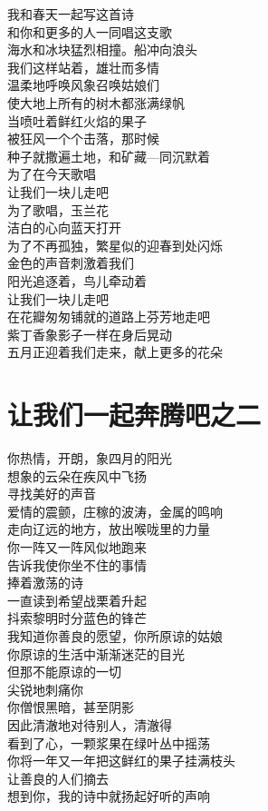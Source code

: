 \documentclass[]{book}
\renewenvironment{quote}{\begin{VF}}{\end{VF}}
\begin{document}
\begin{quote}
我和春天一起写这首诗\\
和你和更多的人一同唱这支歌\\
海水和冰块猛烈相撞。船冲向浪头\\
我们这样站着，雄壮而多情\\
温柔地呼唤风象召唤姑娘们\\
使大地上所有的树木都涨满绿帆\\
当喷吐着鲜红火焰的果子\\
被狂风一个个击落，那时候\\
种子就撒遍土地，和矿藏---同沉默着\\
为了在今天歌唱\\
让我们一块儿走吧\\
为了歌唱，玉兰花\\
洁白的心向蓝天打开\\
为了不再孤独，繁星似的迎春到处闪烁\\
金色的声音刺激着我们\\
阳光追逐着，鸟儿牵动着\\
让我们一块儿走吧\\
在花瓣匆匆铺就的道路上芬芳地走吧\\
紫丁香象影子一样在身后晃动\\
五月正迎着我们走来，献上更多的花朵
\end{quote}

\section{让我们一起奔腾吧之二}

\begin{quote}
你热情，开朗，象四月的阳光\\
想象的云朵在疾风中飞扬\\
寻找美好的声音\\
爱情的震颤，庄稼的波涛，金属的鸣响\\
走向辽远的地方，放出喉咙里的力量\\
你一阵又一阵风似地跑来\\
告诉我使你坐不住的事情\\
捧着激荡的诗\\
一直读到希望战栗着升起\\
抖索黎明时分蓝色的锋芒\\
我知道你善良的愿望，你所原谅的姑娘\\
你原谅的生活中渐渐迷茫的目光\\
但那不能原谅的一切\\
尖锐地刺痛你\\
你僧恨黑暗，甚至阴影\\
因此清澈地对待别人，清澈得\\
看到了心，一颗浆果在绿叶丛中摇荡\\
你将一年又一年把这鲜红的果子挂满枝头\\
让善良的人们摘去\\
想到你，我的诗中就扬起好听的声响
\end{quote}
\end{document}

